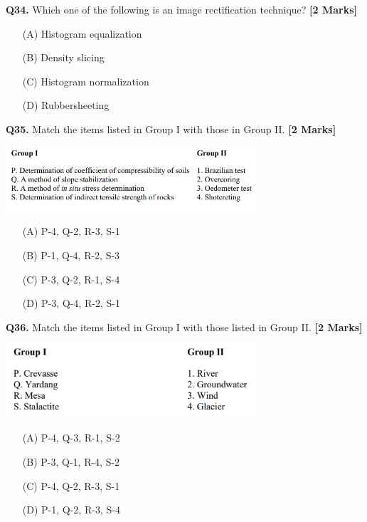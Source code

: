 \documentclass[11pt]{article}
\newcommand{\questionb}[2]{
    \noindent\textbf{Q#2.} #1 \hfill \textbf{[2 Marks]}
}
\begin{document}
\questionb{Which one of the following is an image rectification technique?}{34}
\begin{enumerate}
    \item[(A)] Histogram equalization
    \item[(B)] Density slicing
    \item[(C)] Histogram normalization
    \item[(D)] Rubbersheeting
\end{enumerate}
\vspace{0.5cm}

\questionb{Match the items listed in Group I with those in Group II.}{35}
\begin{center}
\includegraphics[width=0.7\textwidth]{figures/35.png}
\end{center}
\begin{enumerate}
    \item[(A)] P-4, Q-2, R-3, S-1
    \item[(B)] P-1, Q-4, R-2, S-3
    \item[(C)] P-3, Q-2, R-1, S-4
    \item[(D)] P-3, Q-4, R-2, S-1
\end{enumerate}
\vspace{0.5cm}

\questionb{Match the items listed in Group I with those listed in Group II.}{36}
\begin{center}
\includegraphics[width=0.7\textwidth]{figures/36.png}
\end{center}
\begin{enumerate}
    \item[(A)] P-4, Q-3, R-1, S-2
    \item[(B)] P-3, Q-1, R-4, S-2
    \item[(C)] P-4, Q-2, R-3, S-1
    \item[(D)] P-1, Q-2, R-3, S-4
\end{enumerate}
\vspace{0.5cm}
\end{document}
